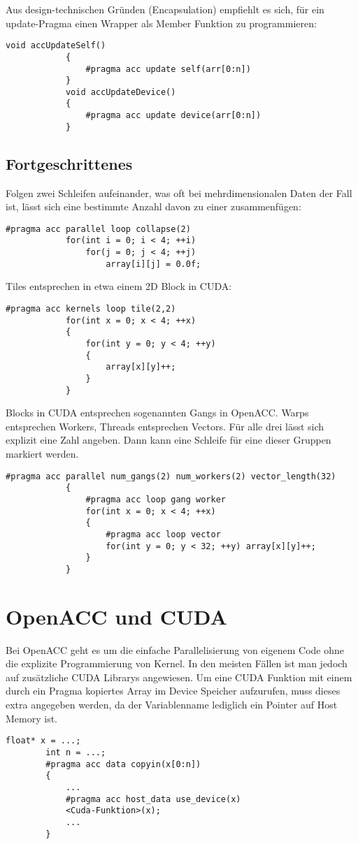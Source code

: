			Aus design-technischen Gründen (Encapsulation) empfiehlt es sich, für ein update-Pragma einen Wrapper als Member Funktion zu programmieren:
			\begin{lstlisting}[caption=~OpenACC: Update Member-Funktion]
			void accUpdateSelf() 
			{
				#pragma acc update self(arr[0:n])
			}
			void accUpdateDevice() 
			{
				#pragma acc update device(arr[0:n])
			}			
			\end{lstlisting}

			\newpage
			\subsection{Fortgeschrittenes}
			Folgen zwei Schleifen aufeinander, was oft bei mehrdimensionalen Daten der Fall ist, lässt sich eine bestimmte Anzahl davon zu einer zusammenfügen:
			\begin{lstlisting}[caption=~OpenACC: Loop Collapse]
			#pragma acc parallel loop collapse(2)
			for(int i = 0; i < 4; ++i) 
				for(j = 0; j < 4; ++j)
					array[i][j] = 0.0f;
			\end{lstlisting}
			
			Tiles entsprechen in etwa einem 2D \Gls{Block} in CUDA:
			\begin{lstlisting}[caption=~OpenACC: Tile]
			#pragma acc kernels loop tile(2,2)
			for(int x = 0; x < 4; ++x)
			{
				for(int y = 0; y < 4; ++y)
				{
					array[x][y]++;
				}
			}
			\end{lstlisting}
			
			\Glspl{Block} in CUDA entsprechen sogenannten \Glspl{Gang} in OpenACC. \Glspl{Warp} entsprechen \Glspl{Worker}, \Glspl{Thread} entsprechen \Glspl{Vector}. Für alle drei lässt sich explizit eine Zahl angeben. Dann kann eine Schleife für eine dieser Gruppen markiert werden.
			\begin{lstlisting}[caption=~OpenACC: Gangs Workers Vectors]
			#pragma acc parallel num_gangs(2) num_workers(2) vector_length(32)
			{
				#pragma acc loop gang worker
				for(int x = 0; x < 4; ++x)
				{
					#pragma acc loop vector
					for(int y = 0; y < 32; ++y) array[x][y]++;
				}
			}			
			\end{lstlisting}
			
		\section{OpenACC und CUDA}
		Bei OpenACC geht es um die einfache Parallelisierung von eigenem Code ohne die explizite Programmierung von \Gls{Kernel}. In den meisten Fällen ist man jedoch auf zusätzliche CUDA Librarys angewiesen. Um eine CUDA Funktion mit einem durch ein Pragma kopiertes Array im Device Speicher aufzurufen, muss dieses extra angegeben werden, da der Variablenname lediglich ein Pointer auf Host Memory ist.
		\begin{lstlisting}[caption=~OpenACC/CUDA Zusammenspiel: Host Memory]
		float* x = ...;
		int n = ...;
		#pragma acc data copyin(x[0:n])
		{
			...
			#pragma acc host_data use_device(x)
			<Cuda-Funktion>(x);
			...
		}
		\end{lstlisting}

